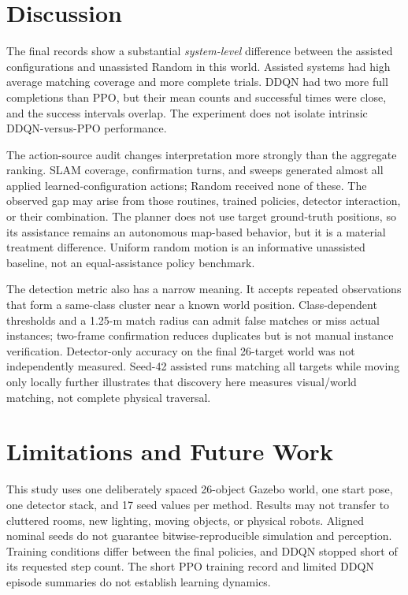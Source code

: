 \documentclass[conference]{IEEEtran}
\begin{document}
\section{Discussion}
The final records show a substantial \emph{system-level} difference between the assisted configurations and unassisted Random in this world. Assisted systems had high average matching coverage and more complete trials. DDQN had two more full completions than PPO, but their mean counts and successful times were close, and the success intervals overlap. The experiment does not isolate intrinsic DDQN-versus-PPO performance.

The action-source audit changes interpretation more strongly than the aggregate ranking. SLAM coverage, confirmation turns, and sweeps generated almost all applied learned-configuration actions; Random received none of these. The observed gap may arise from those routines, trained policies, detector interaction, or their combination. The planner does not use target ground-truth positions, so its assistance remains an autonomous map-based behavior, but it is a material treatment difference. Uniform random motion is an informative unassisted baseline, not an equal-assistance policy benchmark.

The detection metric also has a narrow meaning. It accepts repeated observations that form a same-class cluster near a known world position. Class-dependent thresholds and a 1.25-m match radius can admit false matches or miss actual instances; two-frame confirmation reduces duplicates but is not manual instance verification. Detector-only accuracy on the final 26-target world was not independently measured. Seed-42 assisted runs matching all targets while moving only locally further illustrates that discovery here measures visual/world matching, not complete physical traversal.

\section{Limitations and Future Work}
This study uses one deliberately spaced 26-object Gazebo world, one start pose, one detector stack, and 17 seed values per method. Results may not transfer to cluttered rooms, new lighting, moving objects, or physical robots. Aligned nominal seeds do not guarantee bitwise-reproducible simulation and perception. Training conditions differ between the final policies, and DDQN stopped short of its requested step count. The short PPO training record and limited DDQN episode summaries do not establish learning dynamics.
\end{document}

